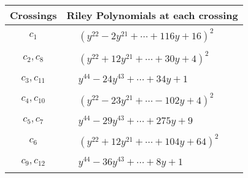 \documentclass[1p]{elsarticle_modified}
\theoremstyle{definition}
\begin{document}
\begin{tabular}{m{50pt}|m{274pt}}
Crossings & \hspace{64pt}Riley Polynomials at each crossing \\
\hline $$\begin{aligned}c_{1}\end{aligned}$$&$\begin{aligned}
&(y^{22}-2 y^{21}+\cdots+116 y+16)^{2}
\end{aligned}$\\
\hline $$\begin{aligned}c_{2},c_{8}\end{aligned}$$&$\begin{aligned}
&(y^{22}+12 y^{21}+\cdots+30 y+4)^{2}
\end{aligned}$\\
\hline $$\begin{aligned}c_{3},c_{11}\end{aligned}$$&$\begin{aligned}
&y^{44}-24 y^{43}+\cdots+34 y+1
\end{aligned}$\\
\hline $$\begin{aligned}c_{4},c_{10}\end{aligned}$$&$\begin{aligned}
&(y^{22}-23 y^{21}+\cdots-102 y+4)^{2}
\end{aligned}$\\
\hline $$\begin{aligned}c_{5},c_{7}\end{aligned}$$&$\begin{aligned}
&y^{44}-29 y^{43}+\cdots+275 y+9
\end{aligned}$\\
\hline $$\begin{aligned}c_{6}\end{aligned}$$&$\begin{aligned}
&(y^{22}+12 y^{21}+\cdots+104 y+64)^{2}
\end{aligned}$\\
\hline $$\begin{aligned}c_{9},c_{12}\end{aligned}$$&$\begin{aligned}
&y^{44}-36 y^{43}+\cdots+8 y+1
\end{aligned}$\\
\hline
\end{tabular}\\~\\
\end{document}
